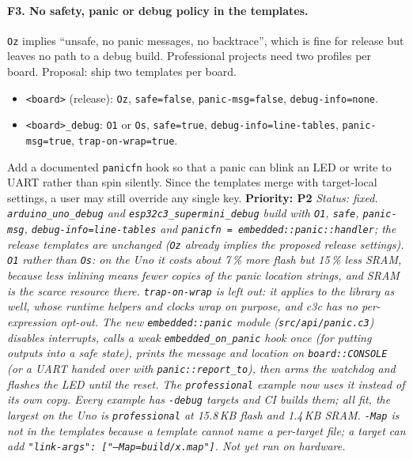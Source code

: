 \documentclass[11pt,a4paper]{article}
\newcommand{\pkg}[1]{\texttt{#1}}
\newcommand{\prio}[1]{\textbf{Priority: #1}}
\begin{document}
\paragraph{F3. No safety, panic or debug policy in the templates.}
\pkg{Oz} implies ``unsafe, no panic messages, no backtrace'', which is fine for release but
leaves no path to a debug build. Professional projects need two profiles per board.
Proposal: ship two templates per board.
\begin{itemize}
  \item \pkg{<board>} (release): \pkg{Oz}, \pkg{safe=false}, \pkg{panic-msg=false}, \pkg{debug-info=none}.
  \item \pkg{<board>\_debug}: \pkg{O1} or \pkg{Os}, \pkg{safe=true}, \pkg{debug-info=line-tables},
        \pkg{panic-msg=true}, \pkg{trap-on-wrap=true}.
\end{itemize}
Add a documented \pkg{panicfn} hook so that a panic can blink an LED or write to UART rather than spin
silently. Since the templates merge with target-local settings, a user may still override any
single key. \prio{P2}
\textit{Status: fixed. \pkg{arduino\_uno\_debug} and \pkg{esp32c3\_supermini\_debug} build with \pkg{O1}, \pkg{safe}, \pkg{panic-msg}, \pkg{debug-info=line-tables} and \pkg{panicfn = embedded::panic::handler}; the release templates are unchanged (\pkg{Oz} already implies the proposed release settings). \pkg{O1} rather than \pkg{Os}: on the Uno it costs about 7\,\% more flash but 15\,\% less SRAM, because less inlining means fewer copies of the panic location strings, and SRAM is the scarce resource there. \pkg{trap-on-wrap} is left out: it applies to the library as well, whose runtime helpers and clocks wrap on purpose, and c3c has no per-expression opt-out. The new \pkg{embedded::panic} module (\pkg{src/api/panic.c3}) disables interrupts, calls a weak \pkg{embedded\_on\_panic} hook once (for putting outputs into a safe state), prints the message and location on \pkg{board::CONSOLE} (or a UART handed over with \pkg{panic::report\_to}), then arms the watchdog and flashes the LED until the reset. The \pkg{professional} example now uses it instead of its own copy. Every example has \pkg{-debug} targets and CI builds them; all fit, the largest on the Uno is \pkg{professional} at 15.8\,KB flash and 1.4\,KB SRAM. \pkg{-Map} is not in the templates because a template cannot name a per-target file; a target can add \pkg{"link-args": ["--Map=build/x.map"]}. Not yet run on hardware.}
\end{document}
